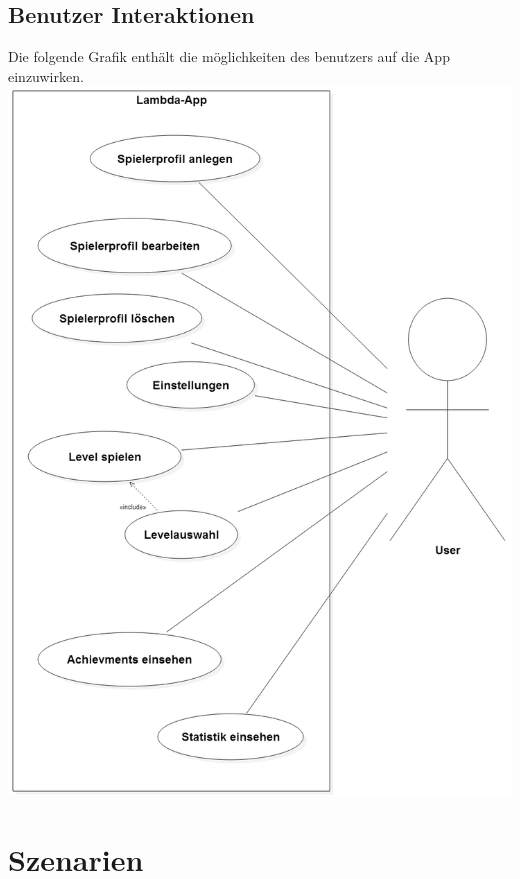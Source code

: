 \documentclass{scrartcl}
\begin{document}
\begin{minipage}{1\textwidth}
\subsection{Benutzer Interaktionen}
Die folgende Grafik enthält die möglichkeiten des benutzers auf die App einzuwirken.\\
\includegraphics[width=\textwidth]{assets/Benutzerdiagramm}
\end{minipage}

\clearpage








\section{Szenarien}
\end{document}
